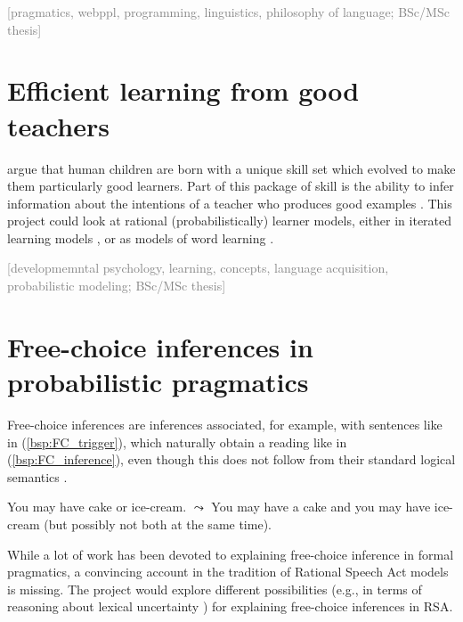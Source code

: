 \documentclass[fleqn,reqno,10pt]{article}
\newcommand{\scope}[1]{\hfill\textcolor{gray}{[#1]}}
\begin{document}
\scope{pragmatics, webppl, programming, linguistics, philosophy of language; BSc/MSc thesis}

\section{Efficient learning from good teachers}

\citet{CsibraGergely2011:Natural-Pedagog} argue that human children are born with a unique
skill set which evolved to make them particularly good learners. Part of this package of skill
is the ability to infer information about the intentions of a teacher who produces good examples
\citep{ShaftoGoodman2014:A-rational-acco}. This project could look at rational
(probabilistically) learner models, either in iterated learning models
\citet{KirbyGriffith2014:Iterated-Learni}, or as models of word learning
\citep{FrankGoodman2014:Inferring-word-}. 

\scope{developmemntal psychology, learning, concepts, language acquisition, probabilistic
  modeling; BSc/MSc thesis}

\section{Free-choice inferences in probabilistic pragmatics}

Free-choice inferences are inferences associated, for example, with sentences like in
(\ref{bsp:FC_trigger}), which naturally obtain a reading like in (\ref{bsp:FC_inference}), even
though this does not follow from their standard logical semantics
\cite{KampFreeChoice1973,KampFreeChoice1978,ZimmermannFreeChoiceDisjunction2000,Fox2007:Free-Choice-and}. 

\begin{exe}
  \ex
  \begin{xlist}
    \ex \label{bsp:FC_trigger} You may have cake or ice-cream.
    \ex \label{bsp:FC_inference} $\leadsto$ You may have a cake and you may have
    ice-cream (but possibly not both at the same time).
  \end{xlist}
\end{exe}

While a lot of work has been devoted to explaining free-choice inference in formal pragmatics,
a convincing account in the tradition of Rational Speech Act models
\cite{FrankGoodman2012:Predicting-Prag} is missing. The project would explore different
possibilities (e.g., in terms of reasoning about lexical uncertainty
\cite{BergenLevy2014:Pragmatic-Reaso}) for explaining free-choice inferences in RSA.
\end{document}
